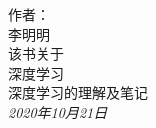 \begin{titlepage}
  \raggedleft
      {\Large 作者：\\ 李明明\\[1in] }
  {\large 该书关于\\}
  {\Huge\scshape 深度学习\\[.2in]}
  {\large 深度学习的理解及笔记\\}
  \vfill
  {\itshape 2020年10月21日}
\end{titlepage}

